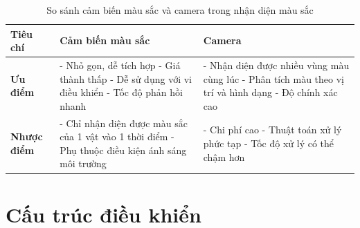     \begin{table}[h!]
        \centering
        \begin{tabular}{|>{\raggedright\arraybackslash}p{4cm}|>{\raggedright\arraybackslash}p{5.5cm}|>{\raggedright\arraybackslash}p{5.5cm}|}
        \hline
        \textbf{Tiêu chí} & \textbf{Cảm biến màu sắc} & \textbf{Camera} \\
        \hline
        \textbf{Ưu điểm} 
        & 
        - Nhỏ gọn, dễ tích hợp \newline
        - Giá thành thấp \newline
        - Dễ sử dụng với vi điều khiển \newline
        - Tốc độ phản hồi nhanh
        &
        - Nhận diện được nhiều vùng màu cùng lúc \newline
        - Phân tích màu theo vị trí và hình dạng \newline
        - Độ chính xác cao \newline
        \\
        \hline
        \textbf{Nhược điểm} 
        & 
        - Chỉ nhận diện được màu sắc của 1 vật vào 1 thời điểm \newline
        - Phụ thuộc điều kiện ánh sáng môi trường \newline
        &
        - Chi phí cao \newline
        - Thuật toán xử lý phức tạp \newline
        - Tốc độ xử lý có thể chậm hơn
        \\
        \hline
        \end{tabular}
        \caption{So sánh cảm biến màu sắc và camera trong nhận diện màu sắc}
    \end{table}


    \section{Cấu trúc điều khiển}
